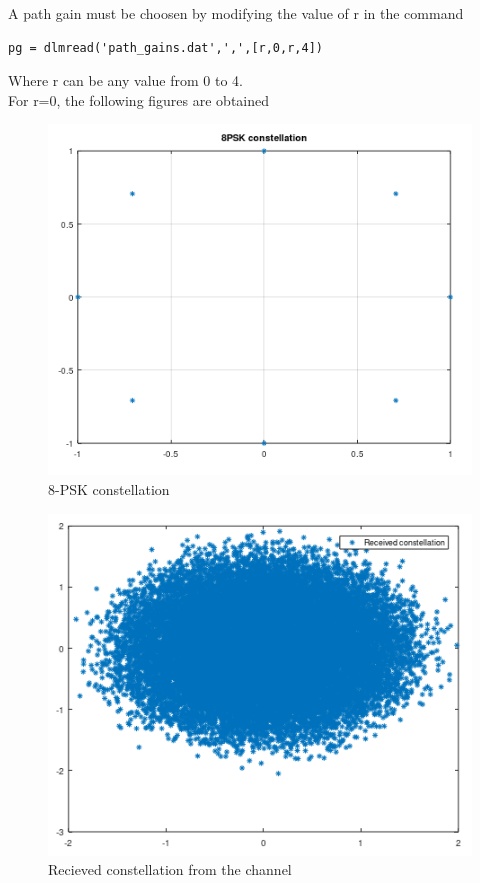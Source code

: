 A path gain must be choosen by modifying the value of r in the command
\begin{lstlisting}
pg = dlmread('path_gains.dat',',',[r,0,r,4])
\end{lstlisting} 
Where r can be any value from 0 to 4.
\\
For r=0, the following figures are obtained
\begin{figure}[!ht]
\centering
\includegraphics[width=\columnwidth]{./figs/psk.PNG}
\caption{8-PSK constellation}
\label{fig:psk}
\end{figure}

\begin{figure}[!ht]
\centering
\includegraphics[width=\columnwidth]{./figs/constellation.PNG}
\caption{Recieved constellation from the channel}
\label{fig:lms_mse}
\end{figure}

